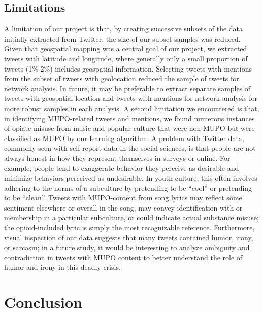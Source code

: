 \documentclass[sigconf]{acmart}
\begin{document}

\subsection{Limitations}

A limitation of our project is that, by creating successive subsets of the data 
initially extracted from Twitter, the size of our subset samples was reduced. 
Given that geospatial mapping was a central goal of our project, we extracted 
tweets with latitude and longitude, where generally only a small proportion of 
tweets (1\%-2\%) includes geospatial information. Selecting tweets with 
mentions from the subset of tweets with geolocation reduced the sample of 
tweets for network analysis. In future, it may be preferable to extract 
separate samples of tweets with geospatial location and tweets with mentions 
for network analysis for more robust samples in each analysis. A second 
limitation we encountered is that, in identifying MUPO-related tweets and 
mentions, we found numerous instances of opiate misuse from music and 
popular culture that were non-MUPO but were classified as MUPO by our learning
algorithm. A problem with Twitter data, commonly seen with self-report data in 
the social sciences, is that people are not always honest in how they represent 
themselves in surveys or online. For example, people tend to exaggerate behavior 
they perceive as desirable and minimize behaviors perceived as undesirable. 
In youth culture, this often involves adhering to the norms of a subculture by 
pretending to be ``cool'' or pretending to be ``clean''. Tweets with MUPO-content 
from song lyrics may reflect some sentiment elsewhere or overall in the song, 
may convey identification with or membership in a particular subculture, or 
could indicate actual substance misuse; the opioid-included lyric is simply 
the most recognizable reference. Furthermore, visual inspection of our data 
suggests that many tweets contained humor, irony, or sarcasm; in a future 
study, it would be interesting to analyze ambiguity and contradiction in 
tweets with MUPO content to better understand the role of humor and irony 
in this deadly crisis. 

\section{Conclusion}
\end{document}
